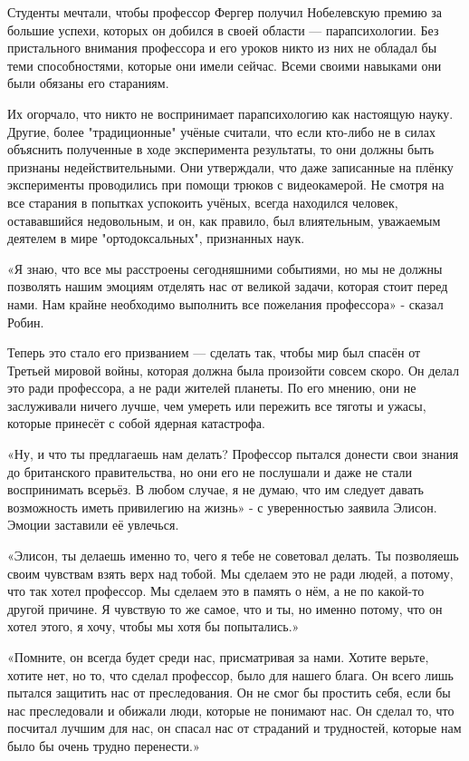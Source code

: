 \documentclass[a4paper,12pt]{book}
\begin{document}
\par
Студенты мечтали, чтобы профессор Фергер получил Нобелевскую премию за большие успехи, которых он добился в своей области — парапсихологии. Без пристального внимания профессора и его уроков никто из них не обладал бы теми способностями, которые они имели сейчас. Всеми своими навыками они были обязаны его стараниям.
\par
Их огорчало, что никто не воспринимает парапсихологию как настоящую науку. Другие, более "традиционные" учёные считали, что если кто-либо не в силах объяснить полученные в ходе эксперимента результаты, то они должны быть признаны недействительными. Они утверждали, что даже записанные на плёнку эксперименты проводились при помощи трюков с видеокамерой. Не смотря на все старания в попытках успокоить учёных, всегда находился человек, остававшийся недовольным, и он, как правило, был влиятельным, уважаемым деятелем в мире "ортодоксальных", признанных наук.\\
\par
«Я знаю, что все мы расстроены сегодняшними событиями, но мы не должны позволять нашим эмоциям отделять нас от великой задачи, которая стоит перед нами. Нам крайне необходимо выполнить все пожелания профессора» - сказал Робин.
\par
Теперь это стало его призванием — сделать так, чтобы мир был спасён от Третьей мировой войны, которая должна была произойти совсем скоро. Он делал это ради профессора, а не ради жителей планеты. По его мнению, они не заслуживали ничего лучше, чем умереть или пережить все тяготы и ужасы, которые принесёт с собой ядерная катастрофа.\\
\par
«Ну, и что ты предлагаешь нам делать? Профессор пытался донести свои знания до британского правительства, но они его не послушали и даже не стали воспринимать всерьёз. В любом случае, я не думаю, что им следует давать возможность иметь привилегию на жизнь» - с уверенностью заявила Элисон. Эмоции заставили её увлечься.
\par
«Элисон, ты делаешь именно то, чего я тебе не советовал делать. Ты позволяешь своим чувствам взять верх над тобой. Мы сделаем это не ради людей, а потому, что так хотел профессор. Мы сделаем это в память о нём, а не по какой-то другой причине. Я чувствую то же самое, что и ты, но именно потому, что он хотел этого, я хочу, чтобы мы хотя бы попытались.»
\par
«Помните, он всегда будет среди нас, присматривая за нами. Хотите верьте, хотите нет, но то, что сделал профессор, было для нашего блага. Он всего лишь пытался защитить нас от преследования. Он не смог бы простить себя, если бы нас преследовали и обижали люди, которые не понимают нас. Он сделал то, что посчитал лучшим для нас, он спасал нас от страданий и трудностей, которые нам было бы очень трудно перенести.»
\end{document}
